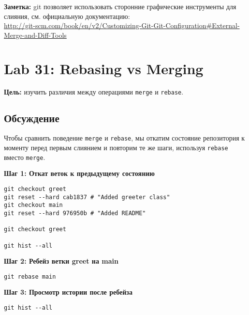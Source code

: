 \documentclass[a4paper,12pt]{report}
\begin{document}
\textbf{Заметка:} git позволяет использовать сторонние графические инструменты для слияния, см. официальную документацию: \\
\url{http://git-scm.com/book/en/v2/Customizing-Git-Git-Configuration#External-Merge-and-Diff-Tools}


\section{Lab 31: Rebasing vs Merging}

\textbf{Цель:} изучить различия между операциями \texttt{merge} и \texttt{rebase}.

\subsection*{Обсуждение}
Чтобы сравнить поведение \texttt{merge} и \texttt{rebase}, мы откатим состояние репозитория к моменту перед первым слиянием и повторим те же шаги, используя \texttt{rebase} вместо \texttt{merge}.

\textbf{Шаг 1: Откат веток к предыдущему состоянию}

\begin{verbatim}
git checkout greet
git reset --hard cab1837 # "Added greeter class"
git checkout main
git reset --hard 976950b # "Added README"

git checkout greet

git hist --all
\end{verbatim}


\textbf{Шаг 2: Ребейз ветки greet на main}

\begin{verbatim}
git rebase main
\end{verbatim}


\textbf{Шаг 3: Просмотр истории после ребейза}

\begin{verbatim}
git hist --all
\end{verbatim}

\end{document}
